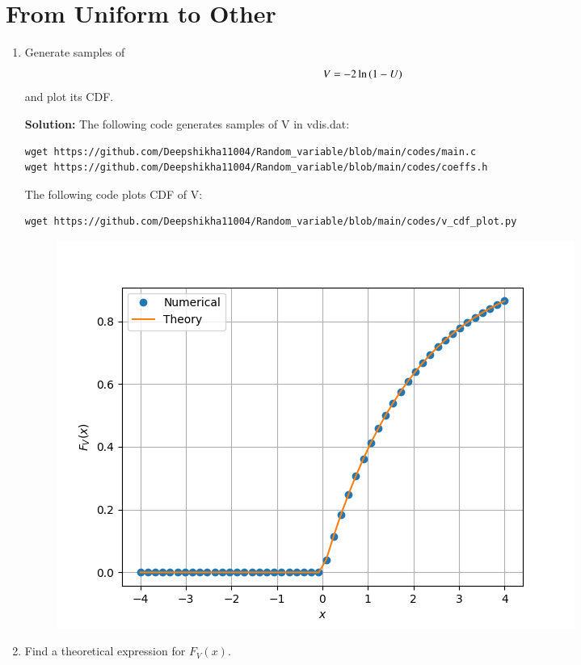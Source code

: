 \documentclass[journal,12pt,twocolumn]{IEEEtran}
\renewcommand\thesection{\arabic{section}}
\begin{document}
\section{From Uniform to Other}
\begin{enumerate}[label=\thesection.\arabic*
,ref=\thesection.\theenumi]
%
\item
Generate samples of 
%
\begin{equation}
V = -2\ln\left(1-U\right)
\end{equation}
%
and plot its CDF.  

\textbf{Solution:}
The following code generates samples of V in vdis.dat:
\begin{lstlisting}
wget https://github.com/Deepshikha11004/Random_variable/blob/main/codes/main.c
wget https://github.com/Deepshikha11004/Random_variable/blob/main/codes/coeffs.h
\end{lstlisting}
The following code plots CDF of V:
\begin{lstlisting}
wget https://github.com/Deepshikha11004/Random_variable/blob/main/codes/v_cdf_plot.py
\end{lstlisting}
\begin{figure}[!ht]
    \centering
    \includegraphics[width=\columnwidth]
    {v_cdf.png}
    \caption{}
    \label{fig1}
\end{figure}


\item Find a theoretical expression for $F_V(x)$.



\end{enumerate}
\end{document}
